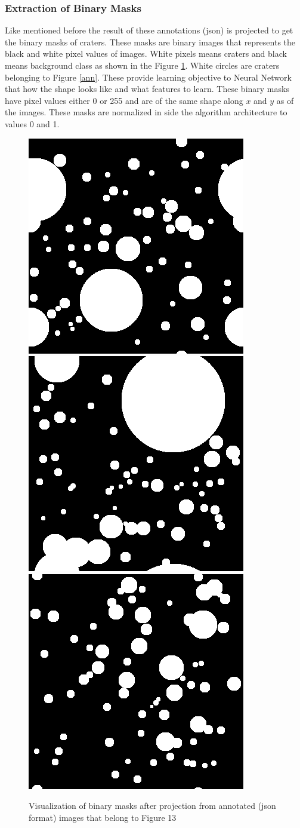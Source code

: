 \documentclass[11pt]{article}
\begin{document}
\subsubsection{Extraction of Binary Masks}
Like mentioned before the result of these annotations (json) is projected to get the binary masks of craters. These masks are binary images that represents the black and white pixel values of images. White pixels means craters and black means background class as shown in the Figure \ref{mask}. White circles are craters belonging to Figure \ref{ann}. These provide learning objective to Neural Network that how the shape looks like and what features to learn. These binary masks have pixel values either 0 or 255 and are of the same shape along $x$ and $y$ as of the images. These masks are normalized in side the algorithm architecture to values 0 and 1.

\begin{figure}[ht!]
	\includegraphics[width=.3\textwidth]{files/annotation/66m.png}\hfill
	\includegraphics[width=.3\textwidth]{files/annotation/29m.png}\hfill
	\includegraphics[width=.3\textwidth]{files/annotation/20m.png}
	\caption{Visualization of binary masks after projection from annotated (json format) images that belong to Figure 13}
	\label{mask}
\end{figure}
\end{document}
